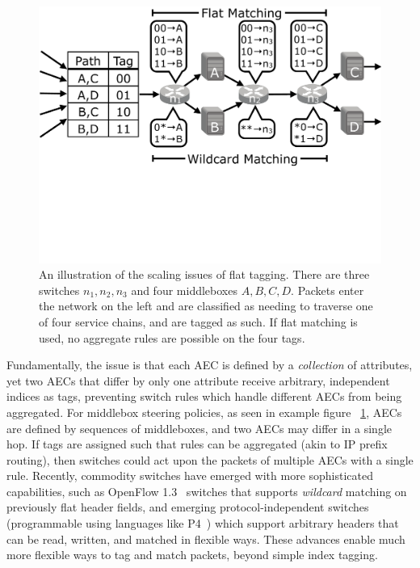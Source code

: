\begin{figure}[t!] 
\begin{minipage}{1\linewidth}
\includegraphics[trim={0 10cm 0 0}, clip, width=\linewidth]{figures/mbox_path_example}
\end{minipage} 
\caption{An illustration of the scaling issues of flat tagging. There are three switches $n_1, n_2, n_3$ and four middleboxes $A,B,C,D$. Packets enter the network on the left and are classified as needing to traverse one of four service chains, and are tagged as such. If flat matching is used, no aggregate rules are possible on the four tags.  }
\label{fig:mbox_path}
\end{figure}
Fundamentally, the issue is that each AEC is defined by a \emph{collection} of attributes, yet two AECs that differ by only one attribute receive arbitrary, independent indices as tags, preventing switch rules which handle different AECs from being aggregated. For middlebox steering policies, as seen in example figure ~\ref{fig:mbox_path}, AECs are defined by sequences of middleboxes, and two AECs may differ in a single hop.  If tags are assigned such that rules can be aggregated (akin to IP prefix routing), then switches could act upon the packets of multiple AECs with a single rule.
Recently, commodity switches have emerged with more sophisticated capabilities, such as OpenFlow 1.3~\cite{of13} switches that supports \emph{wildcard} matching on previously flat header fields, and emerging protocol-independent switches (programmable using languages like P4~\cite{P4}) which support arbitrary headers that can be read, written, and matched in flexible ways.  These advances enable much more flexible ways to tag and match packets, beyond simple index tagging. 

